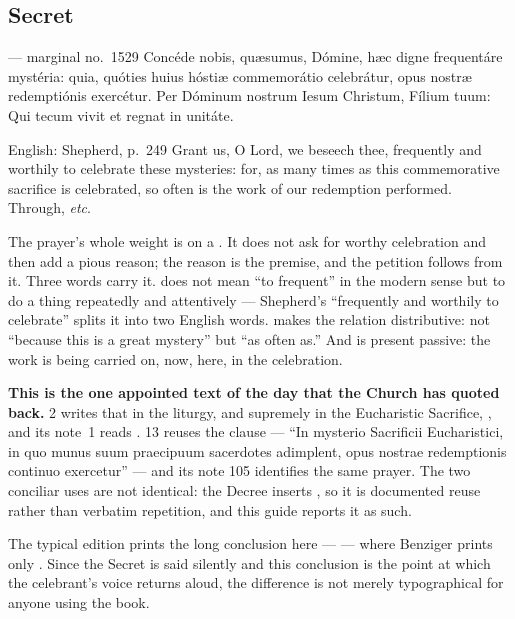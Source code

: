 \subsection*{Secret }

\begin{appointedlatin}{ --- marginal no.\ 1529}
Concéde nobis, quæsumus, Dómine, hæc digne frequentáre mystéria: quia,
quóties huius hóstiæ commemorátio celebrátur, opus nostræ redemptiónis
exercétur. Per Dóminum nostrum Iesum Christum, Fílium tuum: Qui tecum vivit et
regnat in unitáte.
\end{appointedlatin}

\begin{namedtranslation}{English: Shepherd, p.~249}
Grant us, O Lord, we beseech thee, frequently and worthily to celebrate these
mysteries: for, as many times as this commemorative sacrifice is celebrated, so
often is the work of our redemption performed. Through, \textit{etc}.
\end{namedtranslation}

The prayer's whole weight is on a . It does not ask for worthy
celebration and then add a pious reason; the reason is the premise, and the
petition follows from it. Three words carry it.  does not
mean ``to frequent'' in the modern sense but to do a thing repeatedly and
attentively --- Shepherd's ``frequently and worthily to celebrate'' splits it
into two English words.  makes the relation distributive: not
``because this is a great mystery'' but ``as often as.'' And
 is present passive: the work is being carried on, now,
here, in the celebration.

\textbf{This is the one appointed text of the day that the Church has quoted
back.}  2 writes that in the liturgy, and
supremely in the Eucharistic Sacrifice, , and its note~1 reads .  13 reuses the
clause --- ``In mysterio Sacrificii Eucharistici, in quo munus suum praecipuum
sacerdotes adimplent, opus nostrae redemptionis continuo exercetur'' --- and
its note 105 identifies the same prayer. The two conciliar uses are not
identical: the Decree inserts , so it is documented reuse
rather than verbatim repetition, and this guide reports it as such.

The typical edition prints the long conclusion here ---  ---
where Benziger prints only . Since the Secret is said
silently and this conclusion is the point at which the celebrant's voice
returns aloud, the difference is not merely typographical for anyone using the
book.


